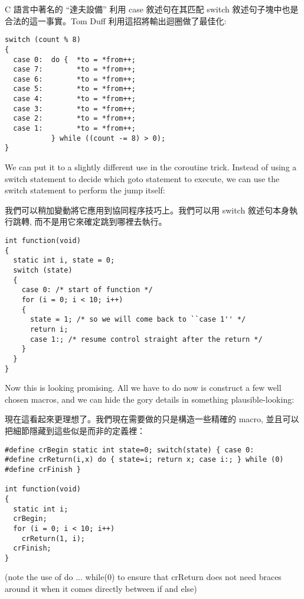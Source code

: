 \documentclass[12pt]{article}
\begin{document}
\begin{CJK}{UTF8}{bsmi}
C 語言中著名的 ``達夫設備'' 利用 case 敘述句在其匹配 switch 敘述句子塊中也是合法的這一事實。Tom Duff
利用這招將輸出迴圈做了最佳化:

\begin{lstlisting}[basicstyle=\footnotesize, breaklines=true]
switch (count % 8) 
{
  case 0:  do {  *to = *from++;
  case 7:        *to = *from++;
  case 6:        *to = *from++;
  case 5:        *to = *from++;
  case 4:        *to = *from++;
  case 3:        *to = *from++;
  case 2:        *to = *from++;
  case 1:        *to = *from++;
           } while ((count -= 8) > 0);
}
\end{lstlisting}

We can put it to a slightly different use in the coroutine trick. Instead of using a switch statement to decide which goto statement to execute, we can use the switch statement to perform the jump itself:

我們可以稍加變動將它應用到協同程序技巧上。我們可以用 switch 敘述句本身執行跳轉, 而不是用它來確定跳到哪裡去執行。 

\begin{lstlisting}[basicstyle=\footnotesize, breaklines=true]
int function(void) 
{
  static int i, state = 0;
  switch (state) 
  {
    case 0: /* start of function */
    for (i = 0; i < 10; i++) 
    {
      state = 1; /* so we will come back to ``case 1'' */
      return i;
      case 1:; /* resume control straight after the return */
    }
  }
}
\end{lstlisting}

Now this is looking promising. All we have to do now is construct a few well chosen macros, and we can hide the gory details in something plausible-looking:

現在這看起來更理想了。我們現在需要做的只是構造一些精確的 macro, 並且可以把細節隱藏到這些似是而非的定義裡： 

\begin{lstlisting}[basicstyle=\footnotesize, breaklines=true]
#define crBegin static int state=0; switch(state) { case 0:
#define crReturn(i,x) do { state=i; return x; case i:; } while (0)
#define crFinish }

int function(void) 
{
  static int i;
  crBegin;
  for (i = 0; i < 10; i++)
    crReturn(1, i);
  crFinish;
}
\end{lstlisting}

(note the use of do ... while(0) to ensure that crReturn does not need braces around it when it comes directly between if and else)


\end{CJK}
\end{document}
